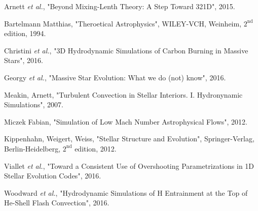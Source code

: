 

\begin{thebibliography}{9}
	
		Arnett \emph{et al.},
		  "Beyond Mixing-Lenth Theory: A Step Toward 321D",
			  2015.


		  Bartelmann Matthias,
		  "Theroetical Astrophysics",
		      WILEY-VCH, Weinheim,
		      $\mathrm{2^{nd}}$ edition,
			  1994.
	
		Christini \emph{et al.},
		  "3D Hydrodynamic Simulations of Carbon Burning in Massive Stars",
			  2016.

		Georgy \emph{et al.},
		"Massive Star Evolution: What we do (not) know",
			  2016.

		  Meakin, Arnett,
		  "Turbulent Convection in Stellar Interiors. I. Hydronynamic Simulations",
			  2007.

		Miczek Fabian,
		  "Simulation of Low Mach Number Astrophysical Flows",
			  2012.


	
		  Kippenhahn, Weigert, Weiss,
		  "Stellar Structure and Evolution",
		      Springer-Verlag, Berlin-Heidelberg,
		        $\mathrm{2^{nd}}$ edition,
			  2012.

		Viallet \emph{et al.},
		  "Toward a Consistent Use of Overshooting Parametrizations in 1D Stellar Evolution Codes",
			  2016.

		Woodward \emph{et al.},
		  "Hydrodynamic Simulations of H Entrainment at the Top of He-Shell Flash Convection",
			  2016.
\end{thebibliography}
